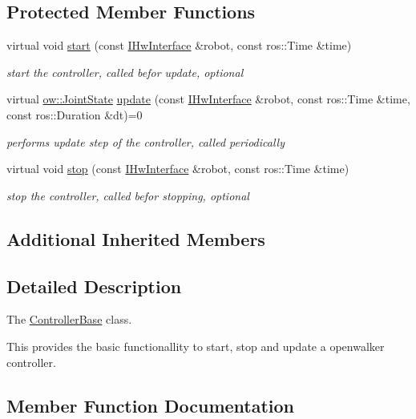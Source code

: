 \subsection*{Protected Member Functions}
\begin{DoxyCompactItemize}
\item 
virtual void \hyperlink{classow_1_1ControllerBase_af757d63078346cff7888f3223d74da01}{start} (const \hyperlink{classow_1_1IHwInterface}{I\+Hw\+Interface} \&robot, const ros\+::\+Time \&time)
\begin{DoxyCompactList}\small\item\em start the controller, called befor update, optional \end{DoxyCompactList}\item 
virtual \hyperlink{classow__core_1_1JointState}{ow\+::\+Joint\+State} \hyperlink{classow_1_1ControllerBase_a214e12fa933fd1dd3e720347e2757d2d}{update} (const \hyperlink{classow_1_1IHwInterface}{I\+Hw\+Interface} \&robot, const ros\+::\+Time \&time, const ros\+::\+Duration \&dt)=0
\begin{DoxyCompactList}\small\item\em performs update step of the controller, called periodically \end{DoxyCompactList}\item 
virtual void \hyperlink{classow_1_1ControllerBase_a006743a64466764e23b215e105b36b86}{stop} (const \hyperlink{classow_1_1IHwInterface}{I\+Hw\+Interface} \&robot, const ros\+::\+Time \&time)
\begin{DoxyCompactList}\small\item\em stop the controller, called befor stopping, optional \end{DoxyCompactList}\end{DoxyCompactItemize}
\subsection*{Additional Inherited Members}


\subsection{Detailed Description}
The \hyperlink{classow_1_1ControllerBase}{Controller\+Base} class. 

This provides the basic functionallity to start, stop and update a openwalker controller. 

\subsection{Member Function Documentation}
